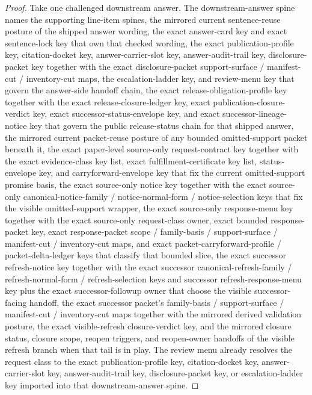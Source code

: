 \documentclass[11pt]{article}
\begin{document}
\begin{proof}
Take one challenged downstream answer.
The downstream-answer spine names the supporting line-item spines, the mirrored current sentence-reuse posture of the shipped answer wording, the exact answer-card key and exact sentence-lock key that own that checked wording, the exact publication-profile key, citation-docket key, answer-carrier-slot key, answer-audit-trail key, disclosure-packet key together with the exact disclosure-packet support-surface / manifest-cut / inventory-cut maps, the escalation-ladder key, and review-menu key that govern the answer-side handoff chain, the exact release-obligation-profile key together with the exact release-closure-ledger key, exact publication-closure-verdict key, exact successor-status-envelope key, and exact successor-lineage-notice key that govern the public release-status chain for that shipped answer, the mirrored current packet-reuse posture of any bounded omitted-support packet beneath it, the exact paper-level source-only request-contract key together with the exact evidence-class key list, exact fulfillment-certificate key list, status-envelope key, and carryforward-envelope key that fix the current omitted-support promise basis, the exact source-only notice key together with the exact source-only canonical-notice-family / notice-normal-form / notice-selection keys that fix the visible omitted-support wrapper, the exact source-only response-menu key together with the exact source-only request-class owner, exact bounded response-packet key, exact response-packet scope / family-basis / support-surface / manifest-cut / inventory-cut maps, and exact packet-carryforward-profile / packet-delta-ledger keys that classify that bounded slice, the exact successor refresh-notice key together with the exact successor canonical-refresh-family / refresh-normal-form / refresh-selection keys and successor refresh-response-menu key plus the exact successor-followup owner that choose the visible successor-facing handoff, the exact successor packet's family-basis / support-surface / manifest-cut / inventory-cut maps together with the mirrored derived validation posture, the exact visible-refresh closure-verdict key, and the mirrored closure status, closure scope, reopen triggers, and reopen-owner handoffs of the visible refresh branch when that tail is in play.
The review menu already resolves the request class to the exact publication-profile key, citation-docket key, answer-carrier-slot key, answer-audit-trail key, disclosure-packet key, or escalation-ladder key imported into that downstream-answer spine.\cite{series:challengeanswerreviewmenus}

\end{proof}
\end{document}
